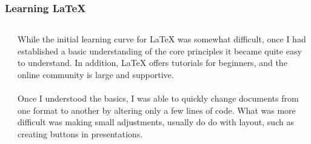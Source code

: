 \documentclass[aspectratio = 169]{beamer}
\begin{document}
\begin{frame}
\label{learning}
\frametitle{Learning LaTeX}
\begin{columns}


\hyperlink{introI}{} \newline
\hyperlink{introII}{} \newline 
\hyperlink{scoping}{} \newline
\hyperlink{elaboration}{} \newline  
\hyperlink{software}{} \newline 
\hyperlink{toolchain}{} \newline 
\hyperlink{learning}{} \newline 
\hyperlink{problems}{} \newline 
\hyperlink{results}{} \newline
\hyperlink{exampleI}{} \newline 
\hyperlink{exampleII}{}  
 

While the initial learning curve for LaTeX was somewhat difficult, once I had established a basic understanding of the core principles it became quite easy to understand. In addition, LaTeX offers tutorials for beginners, and the online community is large and supportive.
\\~\\
Once I understood the basics, I was able to quickly change documents from one format to another by altering only a few lines of code. What was more difficult was making small adjustments, usually do do with layout, such as creating buttons in presentations.

\end{columns}
\end{frame}



\end{document}
